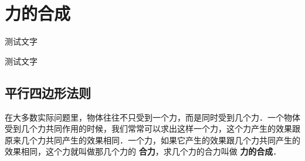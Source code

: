 \section{力的合成}


\begin{Point*}
	测试文字
\end{Point*}

\begin{Case*}
	\item 测试文字
\end{Case*}



\subsection{平行四边形法则}
在大多数实际问题里，物体往往不只受到一个力，而是同时受到几个力．一个物体受到几个力共同作用的时候，我们常常可以求出这样一个力，这个力产生的效果跟原来几个力共同产生的效果相同．一个力，如果它产生的效果跟几个力共同产生的效果相同，这个力就叫做那几个力的\textbf{ 合力}，求几个力的合力叫做\textbf{ 力的合成}．

